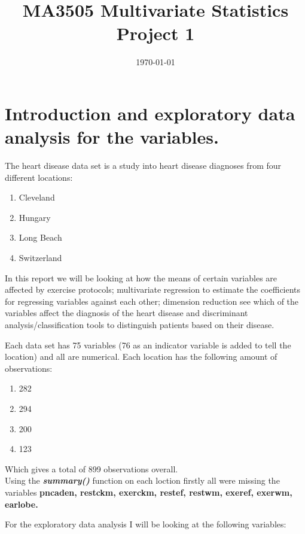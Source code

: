 \documentclass[a4paper]{article}
\title{MA3505 Multivariate Statistics Project 1}
\date{\today}
\begin{document}
\maketitle


\section{Introduction and exploratory data analysis for the variables.}
The heart disease data set is a study into heart disease diagnoses from four different locations:
\begin{enumerate}
\item Cleveland
\item Hungary
\item Long Beach
\item Switzerland\\
\end{enumerate}

In this report we will be looking at how the means of certain variables are affected by exercise protocols; multivariate regression to estimate the coefficients for regressing variables against each other; dimension reduction  see which of the variables affect the diagnosis of the heart disease and  discriminant analysis/classification tools to distinguish patients based on their disease.

Each data set has 75 variables (76 as an indicator variable is added to tell the location) and all are numerical. Each location has the following amount of observations:
\begin{enumerate}
\item 282
\item 294
\item 200
\item 123
\end{enumerate}
Which gives a total of 899 observations overall.\\
Using the \textbf{\textit{summary()}} function on each loction firstly all were missing the variables \textbf{pncaden, restckm, exerckm, restef, restwm, exeref, exerwm, earlobe.}

For the exploratory data analysis I will be looking at the following variables:
\end{document}
